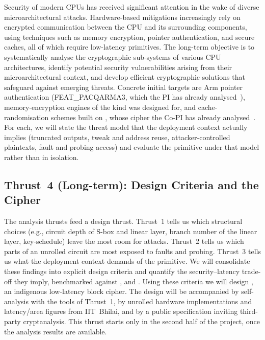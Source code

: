 Security of modern CPUs has received significant attention in the wake of diverse microarchitectural attacks.
Hardware-based mitigations increasingly rely on encrypted communication between the CPU and its surrounding components, using techniques such as memory encryption, pointer authentication, and secure caches, all of which require low-latency primitives.
The long-term objective is to systematically analyse the cryptographic sub-systems of various CPU architectures, identify potential security vulnerabilities arising from their microarchitectural context, and develop efficient cryptographic solutions that safeguard against emerging threats.
Concrete initial targets are Arm pointer authentication (\textsf{FEAT\_PACQARMA3}, which the PI has already analysed~), memory-encryption engines of the kind  was designed for, and cache-randomisation schemes built on , whose cipher the Co-PI has already analysed~.
For each, we will state the threat model that the deployment context actually implies (truncated outputs, tweak and address reuse, attacker-controlled plaintexts, fault and probing access) and evaluate the primitive under that model rather than in isolation.

\subsection{Thrust~4 (Long-term): Design Criteria and the  Cipher}

The analysis thrusts feed a design thrust.
Thrust~1 tells us which structural choices (e.g., circuit depth of S-box and linear layer, branch number of the linear layer, key-schedule) leave the most room for attacks.
Thrust~2 tells us which parts of an unrolled circuit are most exposed to faults and probing.
Thrust~3 tells us what the deployment context demands of the primitive.
We will consolidate these findings into explicit design criteria and quantify the security--latency trade-off they imply, benchmarked against ,  and .
Using these criteria we will design , an indigenous low-latency block cipher.
The design will be accompanied by self-analysis with the tools of Thrust~1, by unrolled hardware implementations and latency/area figures from IIT~Bhilai, and by a public specification inviting third-party cryptanalysis.
This thrust starts only in the second half of the project, once the analysis results are available.

